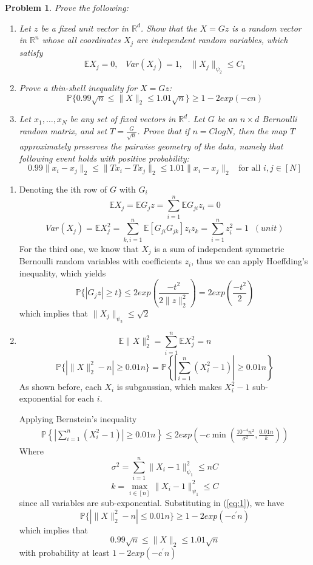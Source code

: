 \documentclass[12pt]{article}
\newtheorem{ex}{Problem}
\begin{document}
\begin{bx}
	
	\begin{ex}
		Prove the following:
		\begin{enumerate}[label=(\alph*)]
			\item Let $z$ be a fixed unit vector in $\mathbb{R}^d$. Show that the $ X = Gz$ is a random vector in $\mathbb{R}^n$ whose all coordinates $X_j$ are independent random variables, which satisfy
			\[
			\mathbb{E}X_j=0 ,\;\;\; Var(X_j)=1 , \;\;\; \|X_j\|_{\psi_2} \le C_1
			\]
			\item  Prove a thin-shell inequality for $X = Gz$:
			\[
			\mathbb{P}\{0.99\sqrt{n} \le \|X\|_2 \le 1.01 \sqrt{n}\} \ge 1-2exp(-cn)
			\]
			\item Let $x_1,\dots,x_N$ be any set of fixed vectors in $\mathbb{R}^d$.
			Let $G$ be an $n \times d$ Bernoulli random matrix, and set $T = \frac{G}{\sqrt{n}}$. Prove that if $n=ClogN$, then the map $T$ approximately preserves the pairwise geometry of the data, namely that following event holds with positive probability:
			\[
			0.99\|x_i-x_j\|_2 \le \|Tx_i-Tx_j\|_2 \le 1.01\|x_i-x_j\|_2 \;\; \; \text{for all } i,j \in [N]
			\]
		\end{enumerate}
	\end{ex}
	\tcblower
	\begin{enumerate}[label=(\alph*)]
	\item Denoting the ith row of $G$ with $G_i$
	\[
	\mathbb{E}X_j = \mathbb{E}G_jz = \sum_{i=1}^{n}\mathbb{E}G_{ji}z_i = 0
	\]
	\[
	Var(X_j) = \mathbb{E}X_j^2 = \sum_{k,i=1}^{n}\mathbb{E}[G_{ji}G_{jk}]z_iz_k = \sum_{i=1}^{n}z_i^2=1 \; \; (unit)
	\]
		For the third one, we know that $X_j$ is a sum of independent symmetric Bernoulli random variables with coefficients $z_i$, thus we can apply Hoeffding's inequality, which yields
	\[
	\mathbb{P}\{\left | G_jz\right | \ge t\} \le 2exp(\frac{-t^2}{2\|z\|_2^2}) = 2exp(\frac{-t^2}{2})
	\]
	which implies that $\|X_j\|_{\psi_2} \le \sqrt{2}$
	\item 
	\[
	\mathbb{E}\|X\|_2^2=\sum_{i=1}^{n}\mathbb{E}X_j^2=n
	\]
	\[
		\mathbb{P}\{\left| \|X\|_2^2 - n\right | \ge 0.01n \} =\mathbb{P} \left \{ \left |\sum_{i=1}^{n}(X_i^2-1)\right | \ge 0.01n \right \}
	\]
	As shown before, each $X_i$ is subgaussian, which makes $X_i^2-1$ sub-exponential for each $i$.
	
	Applying Bernstein's inequality
	\begin{align}\label{eq:1}
	\mathbb{P}\left \{ \left | \sum_{i=1}^{n}(X_i^2-1)\right | \ge 0.01n \right\} \le 2exp(-c \min(\frac{10^{-4}n^2}{\sigma^2},\frac{0.01n}{k}))
	\end{align}
	Where $$\sigma^2 = \sum_{i=1}^{n}\|X_i-1\|_{\psi_1}^2 \le nC$$ $$k=\max_{i\in[n]}\|X_i-1\|_{\psi_1}^2\le C$$ since all variables are sub-exponential.
	Substituting in (\ref{eq:1}), we have
	\[
	\mathbb{P}\{\left| \|X\|_2^2 - n\right | \le 0.01n \} \ge 1-2exp(-c^\prime n)
	\]
which implies that 
\[
0.99\sqrt{n}\le \|X\|_2 \le 1.01 \sqrt{n}
\]
with probability at least $1-2exp(-c^\prime n)$


\end{enumerate}
\end{bx}
\end{document}
